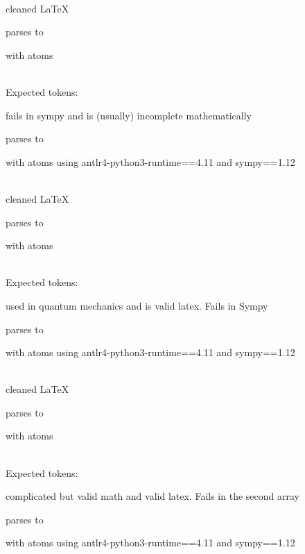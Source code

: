 \documentclass{article}
\begin{document}
\ \\
cleaned \LaTeX

parses to

with atoms


\ \\
Expected tokens:



\hrulefill

fails in sympy and is (usually) incomplete mathematically

parses to

with atoms
using antlr4-python3-runtime==4.11 and sympy==1.12

\ \\
cleaned \LaTeX

parses to

with atoms


\ \\
Expected tokens:


\hrulefill

used in quantum mechanics and is valid latex. Fails in Sympy

parses to

with atoms
using antlr4-python3-runtime==4.11 and sympy==1.12

\ \\
cleaned \LaTeX

parses to

with atoms


\ \\
Expected tokens:


\hrulefill

complicated but valid math and valid latex. Fails in the second array  

parses to

with atoms
using antlr4-python3-runtime==4.11 and sympy==1.12
\end{document}
